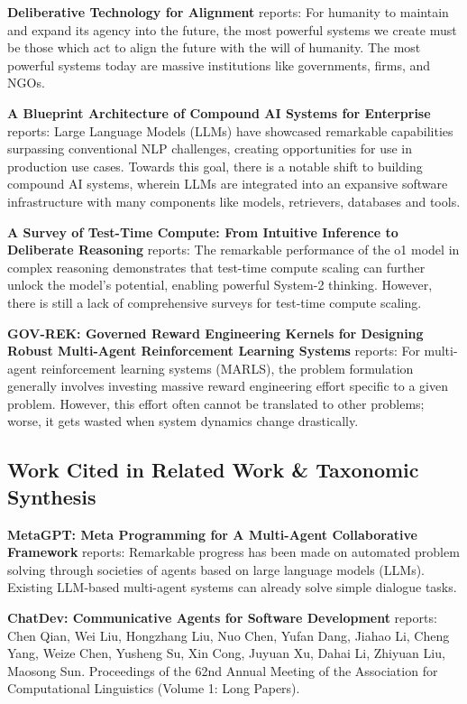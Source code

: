 \documentclass[10pt,journal,compsoc,twocolumn]{IEEEtran}
\begin{document}
\textbf{Deliberative Technology for Alignment} \cite{arxiv_2312_03893} reports: For humanity to maintain and expand its agency into the future, the most powerful systems we create must be those which act to align the future with the will of humanity. The most powerful systems today are massive institutions like governments, firms, and NGOs.

\textbf{A Blueprint Architecture of Compound AI Systems for Enterprise} \cite{arxiv_2406_00584} reports: Large Language Models (LLMs) have showcased remarkable capabilities surpassing conventional NLP challenges, creating opportunities for use in production use cases. Towards this goal, there is a notable shift to building compound AI systems, wherein LLMs are integrated into an expansive software infrastructure with many components like models, retrievers, databases and tools.

\textbf{A Survey of Test-Time Compute: From Intuitive Inference to Deliberate Reasoning} \cite{arxiv_2501_02497} reports: The remarkable performance of the o1 model in complex reasoning demonstrates that test-time compute scaling can further unlock the model's potential, enabling powerful System-2 thinking. However, there is still a lack of comprehensive surveys for test-time compute scaling.

\textbf{GOV-REK: Governed Reward Engineering Kernels for Designing Robust Multi-Agent Reinforcement Learning Systems} \cite{arxiv_2404_01131} reports: For multi-agent reinforcement learning systems (MARLS), the problem formulation generally involves investing massive reward engineering effort specific to a given problem. However, this effort often cannot be translated to other problems; worse, it gets wasted when system dynamics change drastically.


\subsection{Work Cited in Related Work \& Taxonomic Synthesis}


\textbf{MetaGPT: Meta Programming for A Multi-Agent Collaborative Framework} \cite{crossref_10_48550_arxiv_2308_00352} reports: Remarkable progress has been made on automated problem solving through societies of agents based on large language models (LLMs). Existing LLM-based multi-agent systems can already solve simple dialogue tasks.

\textbf{ChatDev: Communicative Agents for Software Development} \cite{crossref_10_18653_v1_2024_acl_long_810} reports: Chen Qian, Wei Liu, Hongzhang Liu, Nuo Chen, Yufan Dang, Jiahao Li, Cheng Yang, Weize Chen, Yusheng Su, Xin Cong, Juyuan Xu, Dahai Li, Zhiyuan Liu, Maosong Sun. Proceedings of the 62nd Annual Meeting of the Association for Computational Linguistics (Volume 1: Long Papers).
\end{document}
